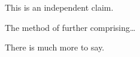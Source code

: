 
\patentClaimsStart


This is an independent claim.


The method of  further comprising\ldots{}


There is much more to say.

\patentClaimsEnd

